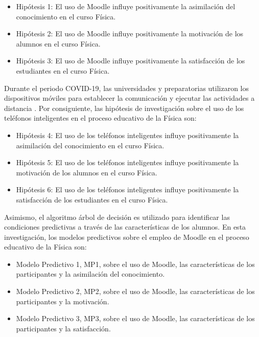 \documentclass[spanish]{textolivre}
\begin{document}
\begin{itemize}
  \item Hipótesis 1: El uso de Moodle influye positivamente la asimilación del conocimiento en el curso Física. 
  \item Hipótesis 2: El uso de Moodle influye positivamente la motivación de los alumnos en el curso Física. 
  \item Hipótesis 3: El uso de Moodle influye positivamente la satisfacción de los estudiantes en el curso Física. 
\end{itemize}

Durante el periodo COVID-19, las universidades y preparatorias utilizaron los dispositivos móviles para establecer la comunicación y ejecutar las actividades a distancia \cite{rysbayeva_students_2022, verawati_enhancing_2022}. Por consiguiente, las hipótesis de investigación sobre el uso de los teléfonos inteligentes en el proceso educativo de la Física son:

\begin{itemize}
  \item Hipótesis 4: El uso de los teléfonos inteligentes influye positivamente la asimilación del conocimiento en el curso Física.
  \item Hipótesis 5: El uso de los teléfonos inteligentes influye positivamente la motivación de los alumnos en el curso Física.
  \item Hipótesis 6: El uso de los teléfonos inteligentes influye positivamente la satisfacción de los estudiantes en el curso Física. 
\end{itemize}

Asimismo, el algoritmo árbol de decisión es utilizado para identificar las condiciones predictivas a través de las características de los alumnos. En esta investigación, los modelos predictivos sobre el empleo de Moodle en el proceso educativo de la Física son:

\begin{itemize}
  \item Modelo Predictivo 1, MP1, sobre el uso de Moodle, las características de los participantes y la asimilación del conocimiento. 
  \item Modelo Predictivo 2, MP2, sobre el uso de Moodle, las características de los participantes y la motivación. 
  \item Modelo Predictivo 3, MP3, sobre el uso de Moodle, las características de los participantes y la satisfacción. 
\end{itemize}
\end{document}
